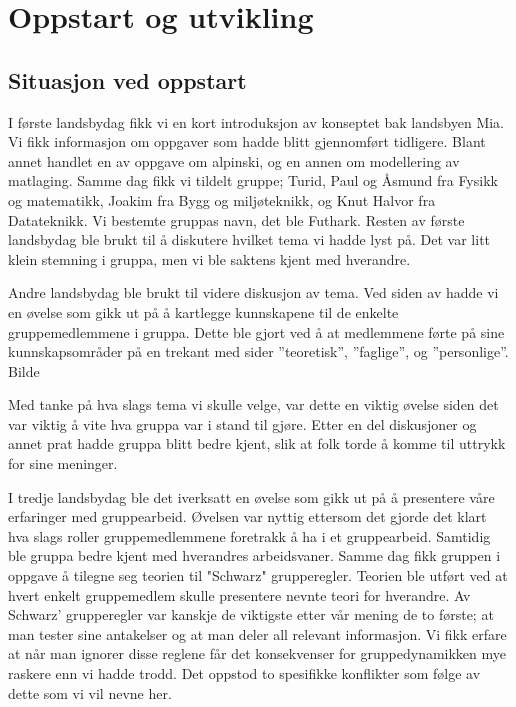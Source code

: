 
\chapter{Oppstart og utvikling}

\section{Situasjon ved oppstart} I første landsbydag fikk vi en kort
introduksjon av konseptet bak landsbyen Mia. Vi fikk informasjon om oppgaver som
hadde blitt gjennomført tidligere. Blant annet handlet en av oppgave om
alpinski, og en annen om modellering av matlaging. Samme dag fikk vi tildelt
gruppe; Turid, Paul og Åsmund fra Fysikk og matematikk, Joakim fra Bygg og
miljøteknikk, og Knut Halvor fra Datateknikk. Vi bestemte gruppas navn, det ble
Futhark. Resten av første landsbydag ble brukt til å diskutere hvilket tema vi
hadde lyst på. Det var litt klein stemning i gruppa, men vi ble saktens kjent
med hverandre. 

Andre landsbydag ble brukt til videre diskusjon av tema. Ved siden av hadde vi
en øvelse som gikk ut på å kartlegge kunnskapene til de enkelte gruppemedlemmene
i gruppa. Dette ble gjort ved å at medlemmene førte på sine kunnskapsområder på
en trekant med sider ”teoretisk”, ”faglige”, og ”personlige”. Bilde

Med tanke på hva slags tema vi skulle velge, var dette en viktig øvelse siden
det var viktig å vite hva gruppa var i stand til gjøre. Etter en del diskusjoner
og annet prat hadde gruppa blitt bedre kjent, slik at folk torde å komme til
uttrykk for sine meninger. 
 
I tredje landsbydag ble det iverksatt en øvelse som gikk ut på å presentere våre
erfaringer med gruppearbeid. Øvelsen var nyttig ettersom det gjorde det klart
hva slags roller gruppemedlemmene foretrakk å ha i et gruppearbeid. Samtidig ble
gruppa bedre kjent med hverandres arbeidsvaner. Samme dag fikk gruppen i oppgave
å tilegne seg teorien til "Schwarz" grupperegler. Teorien ble utført ved at
hvert enkelt gruppemedlem skulle presentere nevnte teori for hverandre. Av
Schwarz’ grupperegler var kanskje de viktigste etter vår mening de to første; at
man tester sine antakelser og at man deler all relevant informasjon.  Vi fikk
erfare at når man ignorer disse reglene får det konsekvenser for
gruppedynamikken mye raskere enn vi hadde trodd. Det oppstod to spesifikke
konflikter som følge av dette som vi vil nevne her.

